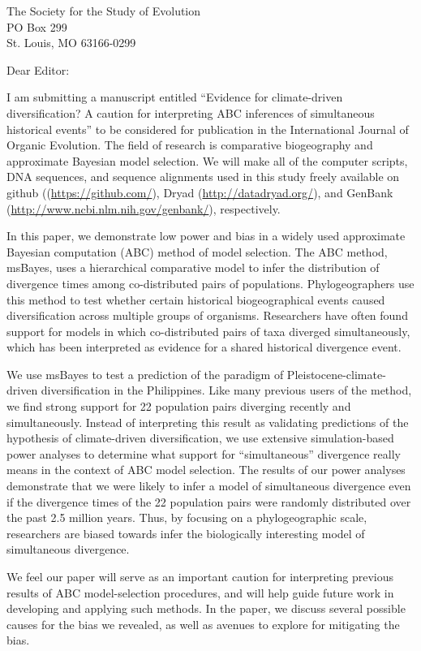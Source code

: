 \documentclass[letterpaper]{letter}
\begin{document}
\begin{letter}{The Society for the Study of Evolution \\
                     PO Box 299 \\
                     St. Louis, MO 63166-0299}
\opening{Dear Editor:}
\raggedright
I am submitting a manuscript entitled ``Evidence for climate-driven diversification? A caution for interpreting ABC inferences of simultaneous historical events'' to be considered for publication in the International Journal of Organic Evolution.
The field of research is comparative biogeography and approximate Bayesian model selection.
We will make all of the computer scripts, DNA sequences, and sequence alignments used in this study freely available on github ((\url{https://github.com/}), Dryad (\url{http://datadryad.org/}), and GenBank (\url{http://www.ncbi.nlm.nih.gov/genbank/}), respectively.

In this paper, we demonstrate low power and bias in a widely used approximate Bayesian computation (ABC) method of model selection.
The ABC method, msBayes, uses a hierarchical comparative model to infer the distribution of divergence times among co-distributed pairs of populations.
Phylogeographers use this method to test whether certain historical biogeographical events caused diversification across multiple groups of organisms.
Researchers have often found support for models in which co-distributed pairs of taxa diverged simultaneously, which has been interpreted as evidence for a shared historical divergence event.

We use msBayes to test a prediction of the paradigm of Pleistocene-climate-driven diversification in the Philippines.
Like many previous users of the method, we find strong support for 22 population pairs diverging recently and simultaneously.
Instead of interpreting this result as validating predictions of the hypothesis of climate-driven diversification, we use extensive simulation-based power analyses to determine what support for ``simultaneous'' divergence really means in the context of ABC model selection.
The results of our power analyses demonstrate that we were likely to infer a model of simultaneous divergence even if the divergence times of the 22 population pairs were randomly distributed over the past 2.5 million years.
Thus, by focusing on a phylogeographic scale, researchers are biased towards infer the biologically interesting model of simultaneous divergence.

We feel our paper will serve as an important caution for interpreting previous results of ABC model-selection procedures, and will help guide future work in developing and applying such methods.
In the paper, we discuss several possible causes for the bias we revealed, as well as avenues to explore for mitigating the bias.


\end{letter}
\end{document}
